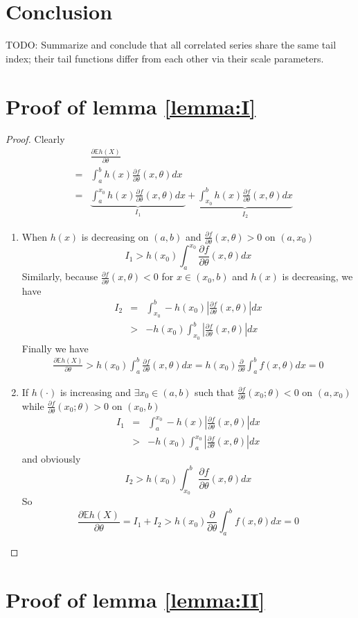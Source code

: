 \documentclass{article}
\newcommand{\pd}[2]{
  \frac{\partial #1}{\partial #2}
}
\newcommand{\opd}[1]{
  \frac{\partial}{\partial #1}
}
\newcommand{\E}{
  \mathbb{E}
}
\newcommand{\1}[1]{
  \mathbf{1}_{\{#1\}}
}
\begin{document}

\section{Conclusion}
TODO: Summarize and conclude that all correlated series share the same
tail index; their tail functions differ from each other via their
scale parameters.

\appendix
\section{Proof of lemma \ref{lemma:I}}
\begin{proof}
  Clearly
  \begin{eqnarray*}
    && \pd{\E h(X)}{\theta} \\
    &=& \int_a^b h(x) \pd{f}{\theta}(x, \theta) dx \\
    &=& \underbrace{\int_a^{x_0} h(x) \pd{f}{\theta}(x, \theta) dx}_{I_1}
    + \underbrace{\int_{x_0}^b h(x) \pd{f}{\theta}(x, \theta) dx}_{I_2}
  \end{eqnarray*}
  \begin{enumerate}
  \item When $h(x)$ is decreasing on $(a, b)$ and $\pd{f}{\theta}(x,
    \theta) > 0$ on $(a, x_0)$
    \[
    I_1 > h(x_0) \int_a^{x_0} \pd{f}{\theta}(x, \theta) dx
    \]
    Similarly, because $\pd{f}{\theta}(x, \theta) < 0$ for $x \in (x_0, b)$ and
    $h(x)$ is decreasing, we have
    \begin{eqnarray*}
      I_2 &=& \int_{x_0}^b -h(x_0)
      \left|\pd{f}{\theta}(x, \theta) \right| dx \\
      &>& -h(x_0)
      \int_{x_0}^b \left| 
        \pd{f}{\theta}(x, \theta)
      \right| dx
    \end{eqnarray*}
    Finally we have
    \begin{eqnarray*}
      \pd{\E h(X)}{\theta}
      > h(x_0) \int_a^b \pd{f}{\theta}(x, \theta) dx
      = h(x_0) \opd{\theta} \int_a^b f(x, \theta) dx
      = 0
    \end{eqnarray*}
  \item If $h(\cdot)$ is increasing and $\exists x_0 \in (a, b)$ such that 
    $\pd{f}{\theta}(x_0; \theta) < 0$ on $(a, x_0)$  while
    $\pd{f}{\theta}(x_0; \theta) > 0$ on $(x_0, b)$
    \begin{eqnarray*}
      I_1 &=&
      \int_a^{x_0} -h(x)
      \left| \pd{f}{\theta}(x, \theta) \right| dx \\
      &>&
      -h(x_0) \int_a^{x_0}
      \left| \pd{f}{\theta}(x, \theta) \right| dx
    \end{eqnarray*}
    and obviously
    \[
    I_2 > h(x_0) \int_{x_0}^b
    \pd{f}{\theta}(x, \theta) dx
    \]
    So
    \[
    \pd{\E h(X)}{\theta}
    = I_1 + I_2
    > h(x_0) \opd{\theta} \int_a^b f(x, \theta) dx = 0
    \]
  \end{enumerate}
\end{proof}

\section{Proof of lemma \ref{lemma:II}}



\end{document}

